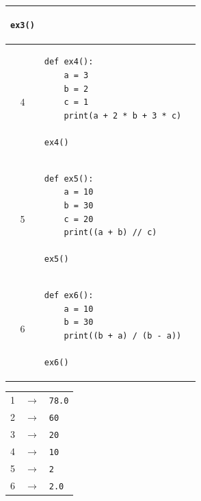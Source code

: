 \documentclass[14pt]{extarticle}
\begin{document}
\begin{enumerate}[label=\textbf{تمرين \arabic*:}, wide=0pt, itemsep=2.2em]
{\begin{longtable}{|c|p{}|p{}|}
\begin{pycell}
\begin{english}
\begin{verbatim}
ex3()
\end{verbatim}
\end{english}
\end{pycell} & \rule{0pt}{1.3cm} \\
\hline
4 &
\begin{pycell}
\begin{english}
\begin{verbatim}
def ex4():
    a = 3
    b = 2
    c = 1
    print(a + 2 * b + 3 * c)

ex4()
\end{verbatim}
\end{english}
\end{pycell} & \rule{0pt}{1.3cm} \\
\hline
5 &
\begin{pycell}
\begin{english}
\begin{verbatim}
def ex5():
    a = 10
    b = 30
    c = 20
    print((a + b) // c)

ex5()
\end{verbatim}
\end{english}
\end{pycell} & \rule{0pt}{1.3cm} \\
\hline
6 &
\begin{pycell}
\begin{english}
\begin{verbatim}
def ex6():
    a = 10
    b = 30
    print((b + a) / (b - a))

ex6()
\end{verbatim}
\end{english}
\end{pycell} & \rule{0pt}{1.3cm} \\
\hline
\end{longtable}
}

\ifwithsols
\begin{boxSolution}
\begin{english}
\renewcommand{\arraystretch}{1.2}
\begin{tabular}{rcl}
1 & $\rightarrow$ & \texttt{78.0} \\
2 & $\rightarrow$ & \texttt{60} \\
3 & $\rightarrow$ & \texttt{20} \\
4 & $\rightarrow$ & \texttt{10} \\
5 & $\rightarrow$ & \texttt{2} \\
6 & $\rightarrow$ & \texttt{2.0} \\
\end{tabular}
\end{english}


\end{boxSolution}
\end{enumerate}
\end{document}
